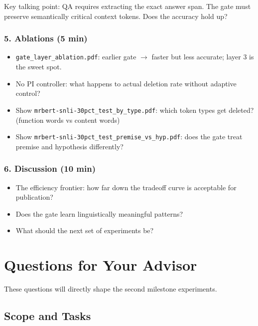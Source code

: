\documentclass[11pt,a4paper]{article}
\begin{document}
Key talking point: QA requires extracting the exact answer span. The gate must preserve semantically critical context tokens. Does the accuracy hold up?

\subsubsection*{5. Ablations (5 min)}

\begin{itemize}[nosep]
    \item \texttt{gate\_layer\_ablation.pdf}: earlier gate $\rightarrow$ faster but less accurate; layer 3 is the sweet spot.
    \item No PI controller: what happens to actual deletion rate without adaptive control?
    \item Show \texttt{mrbert-snli-30pct\_test\_by\_type.pdf}: which token types get deleted? (function words vs content words)
    \item Show \texttt{mrbert-snli-30pct\_test\_premise\_vs\_hyp.pdf}: does the gate treat premise and hypothesis differently?
\end{itemize}

\subsubsection*{6. Discussion (10 min)}

\begin{itemize}[nosep]
    \item The efficiency frontier: how far down the tradeoff curve is acceptable for publication?
    \item Does the gate learn linguistically meaningful patterns?
    \item What should the next set of experiments be?
\end{itemize}


\section{Questions for Your Advisor}
\label{sec:questions}

These questions will directly shape the second milestone experiments.

\subsection{Scope and Tasks}
\end{document}
